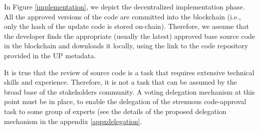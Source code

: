 In Figure \ref{implementation}, we depict the decentralized implementation phase. All the approved versions of the code are committed into the blockchain (i.e., only the hash of the update code is stored on-chain). Therefore, we assume that the developer finds the appropriate (usually the latest) approved base source code in the blockchain and downloads it locally, using the link to the %
 code repository provided in the UP metadata. %

It is true that the review of source code is a task that requires extensive technical skills and experience. Therefore, it is not a task that can be assumed by the broad base of the stakeholders community. A voting delegation mechanism at this point must be in place, to enable the delegation of the strenuous code-approval task to some group of experts (see the details of the proposed delegation mechanism in the appendix \ref{appxdelegation}. 


